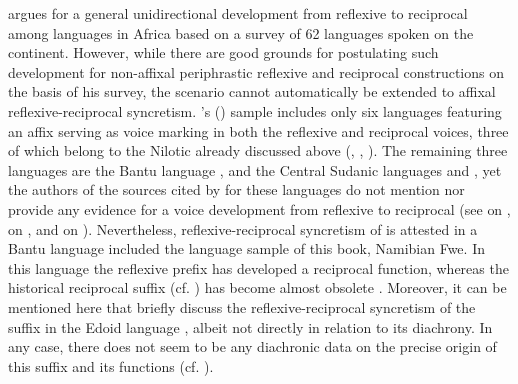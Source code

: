 \cite{heine:2000} argues for a general unidirectional development from reflexive to reciprocal among languages in Africa based on a survey of 62 languages spoken on the continent. However, while there are good grounds for postulating such development for non-affixal periphrastic reflexive and reciprocal constructions on the basis of his survey, the scenario cannot automatically be extended to affixal reflexive-reciprocal syncretism. \citeauthor{heine:2000}’s (\citeyear[20ff.]{heine:2000}) sample includes only six languages featuring an affix serving as voice marking in both the reflexive and reciprocal voices, three of which belong to the Nilotic  already discussed above (, , ). The remaining three languages are the Bantu language , and the Central Sudanic languages  and , yet the authors of the sources cited by \citeauthor{heine:2000} for these languages do not mention nor provide any evidence for a voice development from reflexive to reciprocal (see \citealt{childs:1995} on , \citealt{vorbichler:1965} on , and \citealt{larochette:1958} on ). Nevertheless, reflexive-reciprocal syncretism of  is attested in a Bantu language included the language sample of this book, Namibian Fwe. In this language the reflexive prefix  has developed a reciprocal function, whereas the historical reciprocal suffix  (cf.  ) has become almost obsolete \citep[257ff., 270f.]{gunnink:2018}. Moreover, it can be mentioned here that \cite{heine:miyashita:2008} briefly discuss the reflexive-reciprocal syncretism of the suffix  in the Edoid language , albeit not directly in relation to its diachrony. In any case, there does not seem to be any diachronic data on the precise origin of this suffix and its functions (cf. \citealt{kari:2004}).

